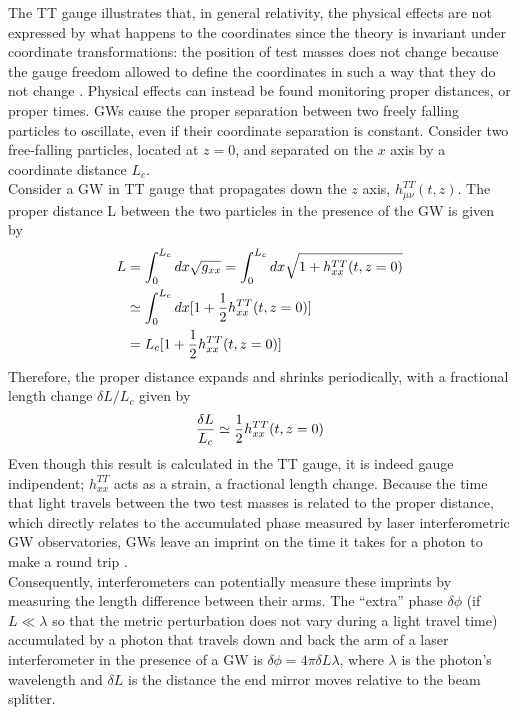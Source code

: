 \documentclass[binding=0.6cm, LaM]{sapthesis}
\begin{document}
        The TT gauge illustrates that, in general relativity, the physical effects are not expressed by what happens
        to the coordinates since the theory is invariant under coordinate transformations:
        the position of test masses does not change because the gauge freedom allowed to define the coordinates
        in such a way that they do not change \cite{3}.
        Physical effects can instead be found monitoring proper distances, or proper times. 
        GWs cause the proper separation between two freely falling particles to oscillate,
        even if their coordinate separation is constant. Consider two  free-falling particles,
        located at $z = 0$, and separated on the $x$ axis by a coordinate distance $L_c$. \\
        Consider a GW in TT gauge that propagates down the $z$ axis, $h^{TT}_{\mu\nu}(t,z)$.
        The proper distance L between the two particles in the presence of the GW is given by
                \begin{align}
                \label{distance}
                	L & = \int^{L_c}_{0}{dx\sqrt{g_{xx}}} = \int^{L_c}_{0}dx\sqrt{1 + h^{TT}_{xx}(t,z=0)} \\
                	  & \simeq \int^{L_c}_{0}{dx[1 + {1 \over 2}h^{TT}_{xx}(t,z=0)]} \\
                	  &= L_c[1 + {1 \over 2}h^{TT}_{xx}(t,z=0)]
                \end{align}
        Therefore, the proper distance expands and shrinks periodically, with a fractional length change $\delta L/L_c$ given by
                \begin{equation}
                	{{\delta L}\over{L_c}} \simeq {1 \over 2} h_{xx}^{TT}(t,z=0)
                \end{equation}
        Even though this result is calculated in the TT gauge, it is indeed gauge indipendent;
        $h_{xx}^{TT}$ acts as a strain, a fractional length change.
        Because the time that light travels between the two test masses is related to the proper distance,
        which directly relates to the accumulated phase measured by laser interferometric GW observatories,
        GWs leave an imprint on the time it takes for a photon to make a round trip \cite{4}. \\
        Consequently, interferometers can potentially measure these imprints by measuring the length difference between
        their arms. The “extra” phase $\delta \phi$ (if $L \ll \lambda$ so that the metric perturbation
	does not vary during a light travel time) accumulated by a photon that travels
        down and back the arm of a laser interferometer in the presence of a GW is $\delta \phi = 4\pi \delta L \lambda$,
        where $\lambda$ is the photon’s wavelength and $\delta L$ is the distance
        the end mirror moves relative to the beam splitter.
\end{document}
